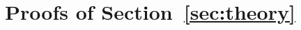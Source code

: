 \sloppy

\newenvironment{restated}[1]{%
  \par\medskip\noindent\textbf{#1 (restated).}\hspace{0.4em}\ignorespaces
}{\par\smallskip}

\newtheorem{remark}{Remark}

\renewcommand{\thefigure}{\thesection.\arabic{figure}}
\renewcommand{\thetable}{\thesection.\arabic{table}}

\section{Proofs of Section~\ref{sec:theory}}
\label{app:proofs}


